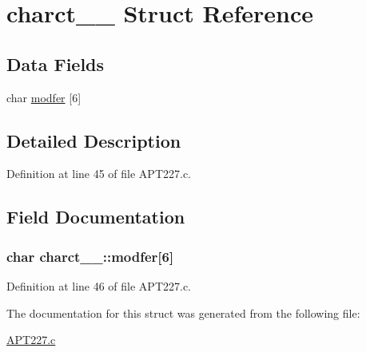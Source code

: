 \hypertarget{structcharct__1__}{}\section{charct\+\_\+\_\+ Struct Reference}
\label{structcharct__1__}
\subsection*{Data Fields}
\begin{DoxyCompactItemize}
\item 
char \hyperlink{structcharct__1___a95b2c653e62e17b1a9c95fbac2c82dbe}{modfer} \mbox{[}6\mbox{]}
\end{DoxyCompactItemize}


\subsection{Detailed Description}


Definition at line 45 of file A\+P\+T227.\+c.



\subsection{Field Documentation}
\subsubsection[{\texorpdfstring{modfer}{modfer}}]{\setlength{\rightskip}{0pt plus 5cm}char charct\+\_\+\_\+\+::modfer\mbox{[}6\mbox{]}}\hypertarget{structcharct__1___a95b2c653e62e17b1a9c95fbac2c82dbe}{}\label{structcharct__1___a95b2c653e62e17b1a9c95fbac2c82dbe}


Definition at line 46 of file A\+P\+T227.\+c.



The documentation for this struct was generated from the following file\+:\begin{DoxyCompactItemize}
\item 
\hyperlink{APT227_8c}{A\+P\+T227.\+c}\end{DoxyCompactItemize}
